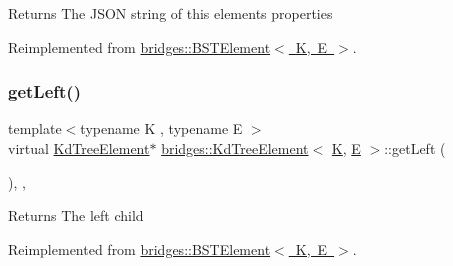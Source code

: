 \begin{DoxyReturn}{Returns}
The J\+S\+ON string of this element\textquotesingle{}s properties 
\end{DoxyReturn}


Reimplemented from \mbox{\hyperlink{classbridges_1_1_b_s_t_element_a623d1495a0d27090dc3fc515d148f381}{bridges\+::\+B\+S\+T\+Element$<$ K, E $>$}}.

\mbox{\label{classbridges_1_1_kd_tree_element_ad7db63a4f82f5252c7e0809ac6486cb4}} 
\subsubsection{\texorpdfstring{getLeft()}{getLeft()}\hspace{0.1cm}{\footnotesize\ttfamily [1/2]}}
{\footnotesize\ttfamily template$<$typename K , typename E $>$ \\
virtual \mbox{\hyperlink{classbridges_1_1_kd_tree_element}{Kd\+Tree\+Element}}$\ast$ \mbox{\hyperlink{classbridges_1_1_kd_tree_element}{bridges\+::\+Kd\+Tree\+Element}}$<$ \mbox{\hyperlink{namespacebridges_acfb0a4f7877d8f63de3e6862004c50edaa5f3c6a11b03839d46af9fb43c97c188}{K}}, \mbox{\hyperlink{namespacebridges_acfb0a4f7877d8f63de3e6862004c50eda3a3ea00cfc35332cedf6e5e9a32e94da}{E}} $>$\+::get\+Left (\begin{DoxyParamCaption}{ }\end{DoxyParamCaption})\hspace{0.3cm}{\ttfamily [inline]}, {\ttfamily [override]}, {\ttfamily [virtual]}}

\begin{DoxyReturn}{Returns}
The left child 
\end{DoxyReturn}


Reimplemented from \mbox{\hyperlink{classbridges_1_1_b_s_t_element_a4d8987373c75b51fca94e3c0b78b87a6}{bridges\+::\+B\+S\+T\+Element$<$ K, E $>$}}.

\mbox{\label{classbridges_1_1_kd_tree_element_ab58af4ca67cb3869c279bfc11952c070}} 

